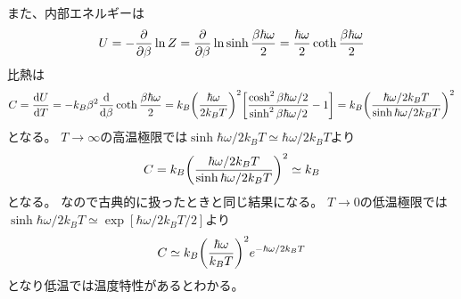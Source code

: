 \documentclass[../../sp_2015.tex]{subfiles}
\begin{document}
また、内部エネルギーは
\begin{equation}\begin{aligned}[b]
    U = -\pdv{\beta}\ln Z
    = \pdv{\beta} \ln\sinh\frac{\beta\hbar\omega}{2}
    =\frac{\hbar\omega}{2}\coth\frac{\beta\hbar\omega}{2}
\end{aligned}\end{equation}
比熱は
\begin{equation}\begin{aligned}[b]
    C = \dv{U}{T}
    = -k_B\beta^2\dv{\beta}\coth\frac{\beta\hbar\omega}{2}
    = k_B\qty(\frac{\hbar\omega}{2k_BT})^2\qty[\frac{\cosh^2\beta\hbar\omega/2}{\sinh^2\beta\hbar\omega/2}-1]
    = k_B \qty(\frac{\hbar\omega/2k_BT}{\sinh\hbar\omega/2k_BT})^2
\end{aligned}\end{equation}
となる。
\(T\to\infty\)の高温極限では\(\sinh\hbar\omega/2k_BT\simeq\hbar\omega/2k_BT\)より
\begin{equation}\begin{aligned}[b]
    C = k_B \qty(\frac{\hbar\omega/2k_BT}{\sinh\hbar\omega/2k_BT})^2\simeq k_B
\end{aligned}\end{equation}
となる。
なので古典的に扱ったときと同じ結果になる。
\(T\to0\)の低温極限では\(\sinh\hbar\omega/2k_BT\simeq \exp[\hbar\omega/2k_BT/2]\)より
\begin{equation}\begin{aligned}[b]
    C \simeq k_B \qty(\frac{\hbar\omega}{k_BT})^2e^{-\hbar\omega/2k_BT}
\end{aligned}\end{equation}
となり低温では温度特性があるとわかる。
\end{document}
